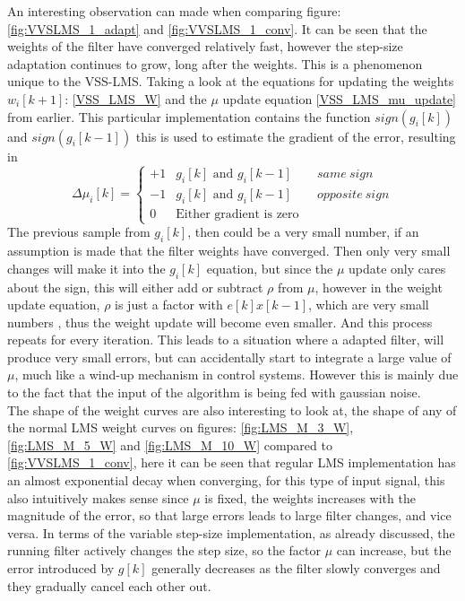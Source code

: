 An interesting observation can made when comparing figure:\ref{fig:VVSLMS_1_adapt} and
\ref{fig:VVSLMS_1_conv}. It can be seen that the weights of the filter have converged 
relatively fast, however the step-size adaptation continues to grow, long after the weights.
This is a phenomenon unique to the VSS-LMS. Taking a look at the equations for updating the
weights $w_i[k+1]$: \ref{VSS_LMS_W} and 
the $\mu$ update equation \ref{VSS_LMS_mu_update} from earlier. This particular implementation
contains the function $sign(g_i[k])$ and $sign(g_i[k-1])$ this is used to estimate the gradient
of the error, resulting in
\begin{equation}
    \Delta\mu_i[k] = 
    \begin{cases}
        +1 & \text{$g_i[k]$ and $g_i[k-1] \qquad same \ sign$} \\
        -1 & \text{$g_i[k]$ and $g_i[k-1] \qquad opposite \ sign$} \\
        0 & \text{Either gradient is zero}
    \end{cases}
    \label{eq:gradient_signs}
\end{equation}
The previous sample from $g_i[k]$, then could be a very small number, if an assumption is made that
the filter weights have converged. Then only very small changes will make it into the $g_i[k]$ equation, 
but since the $\mu$ update only cares about the sign, this will either add or subtract $\rho$ from $\mu$,
however in the weight update equation, $\rho$ is just a factor with $e[k]x[k-1]$, which are very small numbers
, thus the weight update will become even smaller. And this process repeats for every iteration. This leads to a situation
where a adapted filter, will produce very small errors, but can accidentally start to integrate a large value of $\mu$, 
much like a wind-up mechanism in control systems. However this is mainly due to the fact that the 
input of the algorithm is being fed with gaussian noise.\\

The shape of the weight curves are also interesting to look at, the shape of any of the normal LMS
weight curves on figures: \ref{fig:LMS_M_3_W}, \ref{fig:LMS_M_5_W} and \ref{fig:LMS_M_10_W} compared
to \ref{fig:VVSLMS_1_conv}, here it can be seen that regular LMS implementation has an almost
exponential decay when converging, for this type of input signal, this also intuitively makes sense
since $\mu$ is fixed, the weights increases with the magnitude of the error, so that large errors
leads to large filter changes, and vice versa. 
In terms of the variable step-size implementation, as already discussed, the running filter actively
changes the step size, so the factor $\mu$ can increase, but the error introduced by $g[k]$ generally 
decreases as the filter slowly converges and they gradually cancel each other out.\\




